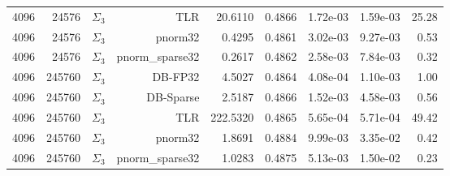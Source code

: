 \begin{tabular}{|r|r|r|r|r|r|r|r|r|}
  4096 & 24576 & $\Sigma_3$ & TLR & 20.6110 & 0.4866 & 1.72e-03 & 1.59e-03 & 25.28 \\
  4096 & 24576 & $\Sigma_3$ & pnorm32 & 0.4295 & 0.4861 & 3.02e-03 & 9.27e-03 & 0.53 \\
  4096 & 24576 & $\Sigma_3$ & pnorm\_sparse32 & 0.2617 & 0.4862 & 2.58e-03 & 7.84e-03 & 0.32 \\
  4096 & 245760 & $\Sigma_3$ & DB-FP32 & 4.5027 & 0.4864 & 4.08e-04 & 1.10e-03 & 1.00 \\
  4096 & 245760 & $\Sigma_3$ & DB-Sparse & 2.5187 & 0.4866 & 1.52e-03 & 4.58e-03 & 0.56 \\
  4096 & 245760 & $\Sigma_3$ & TLR & 222.5320 & 0.4865 & 5.65e-04 & 5.71e-04 & 49.42 \\
  4096 & 245760 & $\Sigma_3$ & pnorm32 & 1.8691 & 0.4884 & 9.99e-03 & 3.35e-02 & 0.42 \\
  4096 & 245760 & $\Sigma_3$ & pnorm\_sparse32 & 1.0283 & 0.4875 & 5.13e-03 & 1.50e-02 & 0.23 \\
  \hline
\end{tabular}
